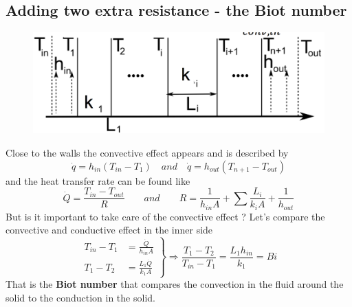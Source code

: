  			\subsection{Adding two extra resistance - the Biot number}
 				\label{sec:3.3.3}
 				\begin{figure}
 				\vspace{-5mm}
 				\includegraphics[scale=0.22]{ch3/7}
 				\end{figure}
 				Close to the walls the convective effect appears and is described by 
 				\begin{equation}
 					\dot{q} = h_{in} (T_{in}-T_1) \quad and \quad \dot{q} = h_{out} (T_{n+1} - T_{out})
 				\end{equation}
 				and the heat transfer rate can be found like 
 				\begin{equation}
 					\dot{Q} = \frac{T_{in}-T_{out}}{R} \qquad and \qquad R = \frac{1}{h_{in}A} + \sum \frac{L_i}{k_iA} + \frac{1}{h_{out}}
 				\end{equation}
 				But is it important to take care of the convective effect ? Let's compare the convective and conductive effect in the inner side 
 				\begin{equation}
 					\left. 
 					\begin{aligned}
 					 	T_{in}-T_1 &= \frac{\dot{Q}}{h_{in} A} \\
 					 	T_1 - T_2 &= \frac{L_1\dot{Q}}{k_1A}
 					\end{aligned}
 					\right\} \Rightarrow \frac{T_1-T_2}{T_{in}-T_1} = \frac{L_1h_{in}}{k_1} = Bi
 				\end{equation}
 				That is the \textbf{Biot number} that compares the convection in the fluid around the solid to the conduction in the solid.
 			

